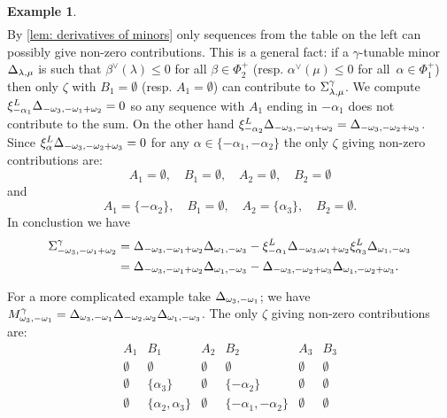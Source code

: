 \documentclass[a4paper]{amsart}
\theoremstyle{definition}
\newtheorem{example}[theorem]{Example}
\begin{document}
\begin{example}
\[\begin{array}{ccc}
    \end{array}
  \]
  By \cref{lem: derivatives of minors} only sequences from the table on the left can possibly give non-zero contributions.
  This is a general fact: if a $\gamma$-tunable minor $\minor[\lambda][\mu]$ is such that $\beta^\vee(\lambda)\leq0$ for all $\beta\in\Phi^+_2$ (resp. $\alpha^\vee(\mu)\leq0$ for all~$\alpha\in\Phi^+_1$) then only $\zeta$ with $B_1=\emptyset$ (resp. $A_1=\emptyset$) can contribute to $\function[\lambda][\mu]$.
  We compute $\xi_{-\alpha_1}^L\minor[-\omega_3][-\omega_1+\omega_2]=0$ so any sequence with $A_1$ ending in $-\alpha_1$ does not contribute to the sum.
  On the other hand $\xi_{-\alpha_2}^L\minor[-\omega_3][-\omega_1+\omega_2]=\minor[-\omega_3][-\omega_2+\omega_3]$. 
  Since $\xi_\alpha^L \minor[-\omega_3][-\omega_2+\omega_3]=0$ for any $\alpha\in\{-\alpha_1, -\alpha_2\}$ the only $\zeta$ giving non-zero contributions are:
  \[
    A_1=\emptyset,\quad B_1 =\emptyset,\quad A_2=\emptyset,\quad B_2=\emptyset
  \]
  and
  \[
    A_1=\{-\alpha_2\},\quad B_1 =\emptyset,\quad A_2=\{\alpha_3\},\quad B_2=\emptyset.
  \]
  In conclustion we have 
  \begin{align*}
    \function[-\omega_3][-\omega_1+\omega_2] 
    &
    = 
    \minor[-\omega_3][-\omega_1+\omega_2] \minor[\omega_1][-\omega_3] - \xi_{-\alpha_1}^L\minor[-\omega_3][\omega_1+\omega_2] \xi_{\alpha_3}^L\minor[\omega_1][-\omega_3]
    \\ &
    =
    \minor[-\omega_3][-\omega_1+\omega_2] \minor[\omega_1][-\omega_3] - \minor[-\omega_3][-\omega_2+\omega_3] \minor[\omega_1][-\omega_2+\omega_3].
  \end{align*}

  For a more complicated example take $\minor[\omega_3][-\omega_1]$; we have $\monomial[{\omega_3}][{-\omega_1}] = \minor[\omega_3][-\omega_1] \minor[-\omega_2][\omega_2] \minor[\omega_1][-\omega_3]$.
  The only $\zeta$ giving non-zero contributions are:
  \[
    \begin{array}{|c|c||c|c||c|c|}
      \hline
      A_1 & B_1 & A_2 & B_2 & A_3 & B_3 \\
      \hline
      \hline
      \emptyset & \emptyset             & \emptyset & \emptyset               & \emptyset & \emptyset \\
      \emptyset & \{\alpha_3\}          & \emptyset & \{-\alpha_2\}           & \emptyset & \emptyset \\
      \emptyset & \{\alpha_2,\alpha_3\} & \emptyset & \{-\alpha_1,-\alpha_2\} & \emptyset & \emptyset \\


\end{array}\]
\end{example}
\end{document}
